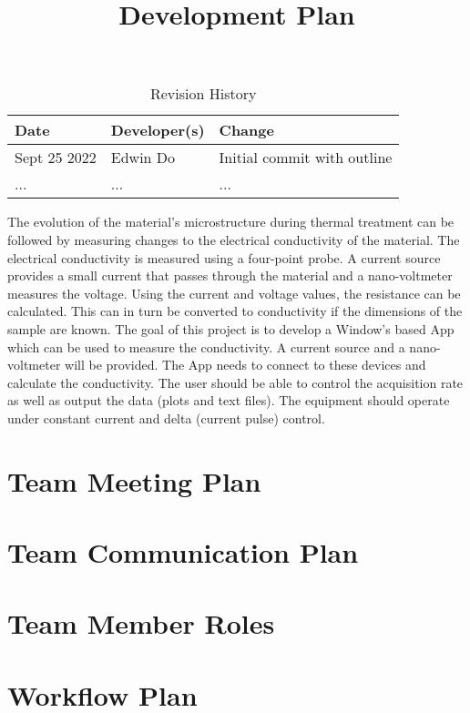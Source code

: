\documentclass{article}
\title{Development Plan\\\progname}
\author{\authname}
\date{}
\begin{document}
\begin{table}[hp]
\caption{Revision History} \label{TblRevisionHistory}
\begin{tabularx}{\textwidth}{llX}
\toprule
\textbf{Date} & \textbf{Developer(s)} & \textbf{Change}\\
\midrule
Sept 25 2022 & Edwin Do & Initial commit with outline\\
... & ... & ...\\
\bottomrule
\end{tabularx}
\end{table}

\newpage

\maketitle

\indent The evolution of the material’s microstructure during thermal treatment can be followed by measuring changes to the electrical conductivity of the material. The electrical conductivity is measured using a four-point probe. A current source provides a small current that passes through the material and a nano-voltmeter measures the voltage. Using the current and voltage values, the resistance can be calculated. This can in turn be converted to conductivity if the dimensions of the sample are known. The goal of this project is to develop a Window’s based App which can be used to measure the conductivity. A current source and a nano- voltmeter will be provided. The App needs to connect to these devices and calculate the conductivity. The user should be able to control the acquisition rate as well as output the data (plots and text files). The equipment should operate under constant current and delta (current pulse) control.

\section{Team Meeting Plan}

\section{Team Communication Plan}

\section{Team Member Roles}

\section{Workflow Plan}
\end{document}
